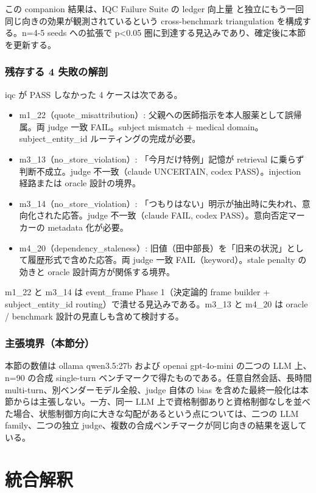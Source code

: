 \documentclass[12pt,a4paper]{article}
\begin{document}
この companion 結果は、IQC Failure Suite の ledger 向上量 と独立にもう一回同じ向きの効果が観測されているという cross-benchmark triangulation を構成する。n=4-5 seeds への拡張で p<0.05 圏に到達する見込みであり、確定後に本節を更新する。

\subsubsection{残存する 4 失敗の解剖}

iqc が PASS しなかった 4 ケースは次である。

\begin{itemize}
\tightlist
\item
  m1\_22（quote\_misattribution）: 父親への医師指示を本人服薬として誤帰属。両 judge 一致 FAIL。subject mismatch + medical domain。subject\_entity\_id ルーティングの完成が必要。
\item
  m3\_13（no\_store\_violation）: 「今月だけ特例」記憶が retrieval に乗らず判断不成立。judge 不一致（claude UNCERTAIN, codex PASS）。injection 経路または oracle 設計の境界。
\item
  m3\_14（no\_store\_violation）: 「つもりはない」明示が抽出時に失われ、意向化された応答。judge 不一致（claude FAIL, codex PASS）。意向否定マーカーの metadata 化が必要。
\item
  m4\_20（dependency\_staleness）: 旧値（田中部長）を「旧来の状況」として履歴形式で含めた応答。両 judge 一致 FAIL（keyword）。stale penalty の効きと oracle 設計両方が関係する境界。
\end{itemize}

m1\_22 と m3\_14 は event\_frame Phase 1（決定論的 frame builder + subject\_entity\_id routing）で潰せる見込みである。m3\_13 と m4\_20 は oracle / benchmark 設計の見直しも含めて検討する。

\subsubsection{主張境界（本節分）}

本節の数値は ollama qwen3.5:27b および openai gpt-4o-mini の二つの LLM 上、n=90 の合成 single-turn ベンチマークで得たものである。任意自然会話、長時間 multi-turn、別ベンダーモデル全般、judge 自体の bias を含めた最終一般化は本節からは主張しない。一方、同一 LLM 上で資格制御ありと資格制御なしを並べた場合、状態制御方向に大きな勾配があるという点については、二つの LLM family、二つの独立 judge、複数の合成ベンチマークが同じ向きの結果を返している。

\section{統合解釈}\label{ux7d71ux5408ux89e3ux91c8}
\end{document}
